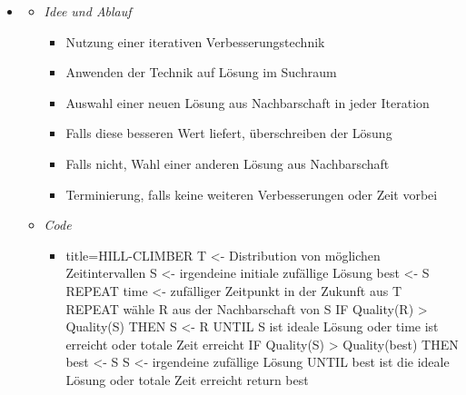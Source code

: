 \documentclass[
    12pt,
    a4paper,
    ngerman,
    color=3b,%
    marginpar=false,
    colorback=false,
    leqno,
]{tudaexercise}
\begin{document}
\begin{itemize}
\begin{itemize}
\begin{itemize}
                    \end{itemize}
            \end{itemize}
\clearpage
        \item {}
            \begin{itemize}
                \item \textit{Idee und Ablauf}
                    \begin{itemize}
                        \item Nutzung einer iterativen Verbesserungstechnik
                        \item Anwenden der Technik auf  Lösung im Suchraum
                        \item Auswahl einer neuen Lösung aus Nachbarschaft in jeder Iteration
                        \item Falls diese besseren Wert liefert, überschreiben der  Lösung
                        \item Falls nicht, Wahl einer anderen Lösung aus Nachbarschaft
                        \item Terminierung, falls keine weiteren Verbesserungen oder Zeit vorbei
                    \end{itemize}
                \item \textit{Code}
                    \begin{itemize}
                        \item[]
                            \begin{ccode}[autogobble,fontsize=\small]{title={HILL-CLIMBER}}
                            T <- Distribution von möglichen Zeitintervallen
                            S <- irgendeine initiale zufällige Lösung
                            best <- S
                            REPEAT
                                time <- zufälliger Zeitpunkt in der Zukunft aus T
                                REPEAT
                                    wähle R aus der Nachbarschaft von S
                                    IF Quality(R) > Quality(S) THEN
                                        S <- R
                                UNTIL S ist ideale Lösung oder time ist erreicht oder totale Zeit erreicht
                                IF Quality(S) > Quality(best) THEN
                                    best <- S
                                S <- irgendeine zufällige Lösung
                            UNTIL best ist die ideale Lösung oder totale Zeit erreicht
                            return best

\end{ccode}
\end{itemize}
\end{itemize}
\end{itemize}
\end{document}
